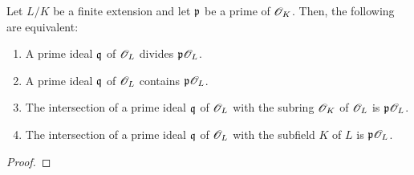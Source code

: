             \begin{lemma}
                Let $L/K$ be a finite extension and let $\mathfrak{p}$ be a prime of $\mathscr{O}_K$. Then, the following are equivalent:
                    \begin{enumerate}
                        \item A prime ideal $\mathfrak{q}$ of $\mathscr{O}_L$ divides $\mathfrak{p}\mathscr{O}_L$.
                        \item A prime ideal $\mathfrak{q}$ of $\mathscr{O}_L$ contains $\mathfrak{p}\mathscr{O}_L$.
                        \item The intersection of a prime ideal $\mathfrak{q}$ of $\mathscr{O}_L$ with the subring $\mathscr{O}_K$ of $\mathscr{O}_L$ is $\mathfrak{p}\mathscr{O}_L$.
                        \item The intersection of a prime ideal $\mathfrak{q}$ of $\mathscr{O}_L$ with the subfield $K$ of $L$ is $\mathfrak{p}\mathscr{O}_L$.
                    \end{enumerate}
            \end{lemma}
                \begin{proof}
                    
                \end{proof}
                
